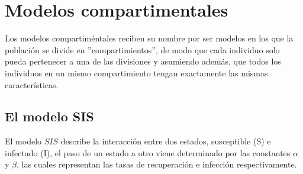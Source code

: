 \section*{Modelos compartimentales}
Los modelos compartiméntales reciben su nombre por ser modelos en los que la población se divide en ''compartimientos'', de modo que cada individuo solo pueda pertenecer a una de las divisiones y asumiendo además, que todos los individuos en un mismo compartimiento tengan exactamente las mismas características.

\subsection*{El modelo SIS}

El modelo $SIS$ describe la interacción entre dos estados, susceptible (S) e infectado (I), el paso de un estado a otro viene determinado por las constantes $\alpha$ y $\beta$, las cuales representan las tasas de recuperación e infección respectivamente.

